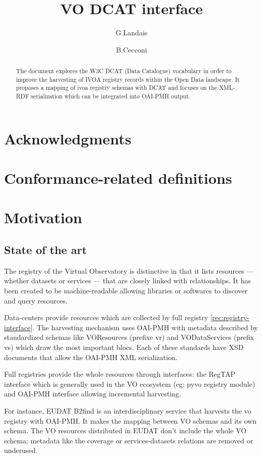 \documentclass[11pt,a4paper]{ivoa}
\title{VO DCAT interface}
\author{G.Landais}
\author{B.Cecconi}
\begin{document}
\begin{abstract}
	The document explores the W3C  DCAT (Data Catalogue) vocabulary in order to improve the harvesting of IVOA registry records within the Open Data landscape. It proposes a mapping of ivoa registry schemas with DCAT and focuses on the XML-RDF serialization which can be integrated into OAI-PMH output.
\end{abstract}


\section*{Acknowledgments}

\section*{Conformance-related definitions}


\section{Motivation}
\subsection{State of the art}
The registry of the Virtual Observatory \cite{std:registry} is distinctive in that it lists resources — whether datasets or services — that are closely linked with relationships. It has been created to be machine-readable allowing libraries or softwares to discover and query resources.

Data-centers provide resources which are collected by full registry \ref{rec:registry-interface}. The harvesting mechanism uses OAI-PMH with metadata described by standardized schemas like  VOResources \cite{std:2018ivoa.spec.0625P} (prefixe vr) and VODataServices \cite{std:vodataservice} (prefix vs) which draw the most important blocs. Each of these standards have XSD documents that allow the OAI-PMH XML serialization.
 
Full registries provide the whole resources through interfaces: the RegTAP interface which is generally used in the VO ecosystem (eg: pyvo registry module) and OAI-PMH interface allowing incremental harvesting.

For instance, EUDAT B2find is an interdisciplinary service  that harvests the vo registry with OAI-PMH. It makes the mapping between VO schemas and its own schema. The VO resources distributed in EUDAT don't include the whole VO schema; metadata like the coverage or services-datasets relations are removed or underused.
\end{document}
